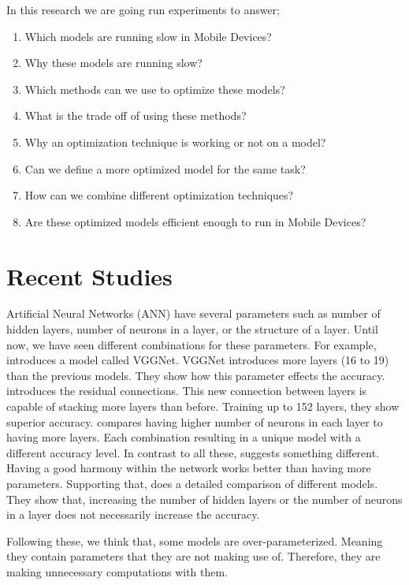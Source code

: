 In this research we are going run experiments to answer;
\begin{enumerate}
\item    Which models are running slow in Mobile Devices?
\item    Why these models are running slow?
\item    Which methods can we use to optimize these models?
\item    What is the trade off of using these methods?
\item    Why an optimization technique is working or not on a model?
\item    Can we define a more optimized model for the same task?
\item    How can we combine different optimization techniques?
\item    Are these optimized models efficient enough to run in Mobile Devices? 
\end{enumerate}

\section{Recent Studies}
Artificial Neural Networks (ANN) have several parameters such as number of hidden layers, number of neurons in a layer, or the structure of a layer. Until now, we have seen different combinations for these parameters. For example, \cite{Simonyan:2014aa} introduces a model called VGGNet. VGGNet introduces more layers (16 to 19) than the previous models. They show how this parameter effects the accuracy. \cite{He:2015aa} introduces the residual connections. This new connection between layers is capable of stacking more layers than before. Training up to 152 layers, they show superior accuracy. \cite{Zagoruyko:2016aa} compares having higher number of neurons in each layer to having more layers. Each combination resulting in a unique model with a different accuracy level. In contrast to all these, \cite{Szegedy:2014aa} suggests something different. Having a good harmony within the network works better than having more parameters. Supporting that, \cite{Canziani:2016aa} does a detailed comparison of different models. They show that, increasing the number of hidden layers or the number of neurons in a layer does not necessarily increase the accuracy. 

Following these, we think that, some models are over-parameterized. Meaning they contain parameters that they are not making use of. Therefore, they are making unnecessary computations with them.


